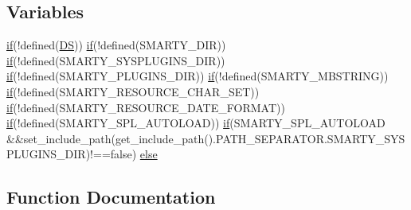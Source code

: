 \subsection*{Variables}
\begin{DoxyCompactItemize}
\item 
\hyperlink{app_2views_2index_2index_8php_a3d726968fd3dc3d64cac837a26187799}{if}(!defined(\textquotesingle{}\hyperlink{constants_8php_ae073998f73900b8375397889044c8313}{D\+S}\textquotesingle{})) \hyperlink{app_2views_2index_2index_8php_a3d726968fd3dc3d64cac837a26187799}{if}(!defined(\textquotesingle{}S\+M\+A\+R\+T\+Y\+\_\+\+D\+I\+R\textquotesingle{})) \hyperlink{app_2views_2index_2index_8php_a3d726968fd3dc3d64cac837a26187799}{if}(!defined(\textquotesingle{}S\+M\+A\+R\+T\+Y\+\_\+\+S\+Y\+S\+P\+L\+U\+G\+I\+N\+S\+\_\+\+D\+I\+R\textquotesingle{})) \hyperlink{app_2views_2index_2index_8php_a3d726968fd3dc3d64cac837a26187799}{if}(!defined(\textquotesingle{}S\+M\+A\+R\+T\+Y\+\_\+\+P\+L\+U\+G\+I\+N\+S\+\_\+\+D\+I\+R\textquotesingle{})) \hyperlink{app_2views_2index_2index_8php_a3d726968fd3dc3d64cac837a26187799}{if}(!defined(\textquotesingle{}S\+M\+A\+R\+T\+Y\+\_\+\+M\+B\+S\+T\+R\+I\+N\+G\textquotesingle{})) \hyperlink{app_2views_2index_2index_8php_a3d726968fd3dc3d64cac837a26187799}{if}(!defined(\textquotesingle{}S\+M\+A\+R\+T\+Y\+\_\+\+R\+E\+S\+O\+U\+R\+C\+E\+\_\+\+C\+H\+A\+R\+\_\+\+S\+E\+T\textquotesingle{})) \hyperlink{app_2views_2index_2index_8php_a3d726968fd3dc3d64cac837a26187799}{if}(!defined(\textquotesingle{}S\+M\+A\+R\+T\+Y\+\_\+\+R\+E\+S\+O\+U\+R\+C\+E\+\_\+\+D\+A\+T\+E\+\_\+\+F\+O\+R\+M\+A\+T\textquotesingle{})) \hyperlink{app_2views_2index_2index_8php_a3d726968fd3dc3d64cac837a26187799}{if}(!defined(\textquotesingle{}S\+M\+A\+R\+T\+Y\+\_\+\+S\+P\+L\+\_\+\+A\+U\+T\+O\+L\+O\+A\+D\textquotesingle{})) \hyperlink{app_2views_2index_2index_8php_a3d726968fd3dc3d64cac837a26187799}{if}(S\+M\+A\+R\+T\+Y\+\_\+\+S\+P\+L\+\_\+\+A\+U\+T\+O\+L\+O\+A\+D \&\&set\+\_\+include\+\_\+path(get\+\_\+include\+\_\+path().P\+A\+T\+H\+\_\+\+S\+E\+P\+A\+R\+A\+T\+O\+R.\+S\+M\+A\+R\+T\+Y\+\_\+\+S\+Y\+S\+P\+L\+U\+G\+I\+N\+S\+\_\+\+D\+I\+R)!==false) \hyperlink{_smarty_8class_8php_ae717eabe25e89fde2ea4c34b4995539d}{else}
\end{DoxyCompactItemize}


\subsection{Function Documentation}
\hypertarget{_smarty_8class_8php_aaef1cef23ac934a90b948d5416d0d452}{}
